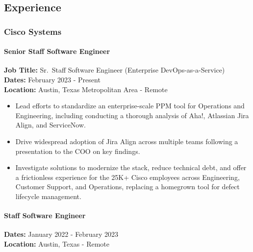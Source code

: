 \documentclass[
]{article}
\providecommand{\tightlist}{%
  \setlength{\itemsep}{0pt}\setlength{\parskip}{0pt}}
\renewcommand{\tightlist}{%
  \setlength{\itemsep}{0.12em}\setlength{\parskip}{0pt}\setlength{\parsep}{0pt}%
}
\begin{document}
\subsection{Experience}\label{experience}

\subsubsection{Cisco Systems}\label{cisco-systems}

\paragraph{Senior Staff Software
Engineer}\label{senior-staff-software-engineer}

\textbf{Job Title:} Sr.~Staff Software Engineer (Enterprise
DevOps-as-a-Service)\\
\textbf{Dates:} February 2023 - Present\\
\textbf{Location:} Austin, Texas Metropolitan Area - Remote

\begin{itemize}
\tightlist
\item
  Lead efforts to standardize an enterprise-scale PPM tool for
  Operations and Engineering, including conducting a thorough analysis
  of Aha!, Atlassian Jira Align, and ServiceNow.
\item
  Drive widespread adoption of Jira Align across multiple teams
  following a presentation to the COO on key findings.
\item
  Investigate solutions to modernize the stack, reduce technical debt,
  and offer a frictionless experience for the 25K+ Cisco employees
  across Engineering, Customer Support, and Operations, replacing a
  homegrown tool for defect lifecycle management.
\end{itemize}

\paragraph{Staff Software Engineer}\label{staff-software-engineer}

\textbf{Dates:} January 2022 - February 2023\\
\textbf{Location:} Austin, Texas - Remote
\end{document}
